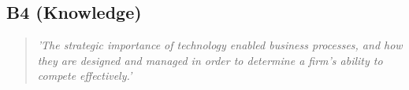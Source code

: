 \subsection*{B4 (Knowledge)}

  \begin{quote}
    \textit{'The strategic importance of technology
    enabled business processes, and how they are designed
    and managed in order to determine a firm’s ability to
    compete effectively.'}
  \end{quote}

\newpage